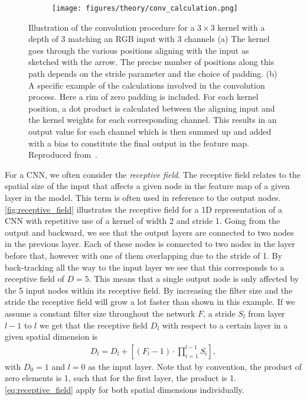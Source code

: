 \begin{figure}[!htb]
  \centering
  \begin{subfigure}[t]{0.26\textwidth}
    \centering
    \raggedleft
    \caption{}
  \end{subfigure}
  \hfill
  \begin{subfigure}[t]{0.70\textwidth}
    \centering
    \texttt{[image: figures/theory/conv\_calculation.png]}
    \caption{}
    \label{fig:conv_calculation}
  \end{subfigure}
  \hfill

  \caption{Illustration of the convolution procedure for a $3 \times 3$ kernel with a depth of 3 matching an RGB input with 3 channels (a) The kernel goes through the various positions aligning with the input as sketched with the arrow. The precise number of positions along this path depends on the stride parameter and the choice of padding. (b) A specific example of the calculations involved in the convolution process. Here a rim of zero padding is included. For each kernel position, a dot product is calculated between the aligning input and the kernel weights for each corresponding channel. This results in an output value for each channel which is then summed up and added with a bias to constitute the final output in the feature map. Reproduced from~\cite{CNN_calc}.}
  \label{fig:conv_example}
\end{figure}

For a \acrshort{CNN}, we often consider the \textit{receptive field}. The receptive field relates to the spatial size of the input that affects a given
node in the feature map of a given layer in the model. This term is often used in reference to the output nodes. \cref{fig:receptive_field} illustrates the
receptive field for a 1D representation of a \acrshort{CNN} with repetitive use
of a kernel of width 2 and stride 1. Going from the output and backward, we see that the output layers are connected to two nodes in the previous layer. Each of these nodes is connected to two nodes in the layer before that, however with one of them overlapping due to the stride of 1. By back-tracking all the way to the input layer we see that this corresponds to a receptive field of $D = 5$. This means that a single output node is only affected by the 5 input nodes within its receptive field. By increasing the filter size and
the stride the receptive field will grow a lot faster than shown in this example. If we assume a constant filter size throughout the network $F$, a stride $S_l$ from layer $l-1$ to $l$ we get that the receptive field $D_l$ with respect to a certain layer in a given spatial dimension is
\begin{align}
    D_l = D_l + \left[(F_l - 1) \cdot \prod_{i=1}^{l-1}S_i \right],
    \label{eq:receptive_field}
\end{align}
with $D_0 = 1$ and $l=0$ as the input layer. Note that by convention, the
product of zero elements is 1, such that for the first layer, the product is 1. \cref{eq:receptive_field} apply for both spatial dimensions individually. 

